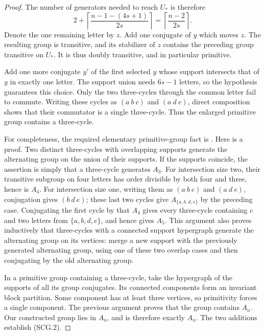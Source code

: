 \begin{proof}
The number of generators needed to reach $U_*$ is therefore
\[
 2+\left\lceil\frac{n-1-(4s+1)}{2s}\right\rceil
       =\left\lceil\frac{n-2}{2s}\right\rceil.
       \tag{SCG.3}
\]
Denote the one remaining letter by $z$. Add one conjugate of $y$
which moves $z$. The resulting group is transitive, and its stabilizer
of $z$ contains the preceding group transitive on $U_*$. It is thus
doubly transitive, and in particular primitive.

Add one more conjugate $y'$ of the first selected $y$ whose support
intersects that of $y$ in exactly one letter. The support union needs
$6s-1$ letters, so the hypothesis guarantees this choice. Only the
two three-cycles through the common letter fail to commute.
Writing these cycles as $(a\ b\ c)$ and $(a\ d\ e)$, direct
composition shows that their commutator is a single three-cycle.
Thus the enlarged primitive group contains a three-cycle.

For completeness, the required elementary primitive-group fact is
\cite[Proposition2.1 and proof, author copy p.4]{SF:Hall1995Finitary}.
Here is a proof. Two distinct three-cycles with overlapping supports
generate the alternating group on the union of their supports.
If the supports coincide, the assertion is simply that a three-cycle
generates $A_3$. For intersection size two, their transitive subgroup on four letters
has order divisible by both four and three, hence is $A_4$.
For intersection size one, writing them as $(a\ b\ c)$ and
$(a\ d\ e)$, conjugation gives $(b\ d\ e)$; these last two
cycles give $A_{\{a,b,d,e\}}$ by the preceding case. Conjugating
the first cycle by that $A_4$ gives every three-cycle containing
$c$ and two letters from $\{a,b,d,e\}$, and hence gives $A_5$.
This argument also proves inductively that three-cycles with a
connected support hypergraph generate the alternating group on
its vertices: merge a new support with the previously generated
alternating group, using one of these two overlap cases and then
conjugating by the old alternating group.

In a primitive group containing a three-cycle, take the hypergraph
of the supports of all its group conjugates. Its connected
components form an invariant block partition. Some component has
at least three vertices, so primitivity forces a single component.
The previous argument proves that the group contains $A_n$.
Our constructed group lies in $A_n$, and is therefore exactly $A_n$.
The two additions establish (SCG.2).


\end{proof}
